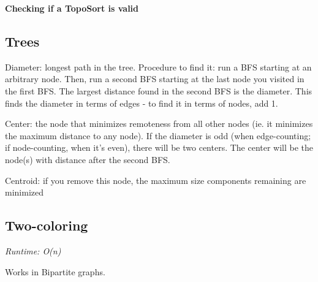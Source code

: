 \textbf{Checking if a TopoSort is valid}



\subsection*{Trees}

Diameter: longest path in the tree. Procedure to find it: run a BFS starting at an arbitrary node. Then, run a second BFS starting at the last node you visited in the first BFS. The largest distance found in the second BFS is the diameter. This finds the diameter in terms of edges - to find it in terms of nodes, add 1.

Center: the node that minimizes remoteness from all other nodes (ie. it minimizes the maximum distance to any node). If the diameter is odd (when edge-counting; if node-counting, when it's even), there will be two centers. The center will be the node(s) with distance  after the second BFS.

Centroid: if you remove this node, the maximum size components remaining are minimized

\subsection*{Two-coloring}

\textit{Runtime: O(n)}

Works in Bipartite graphs.




\newpage